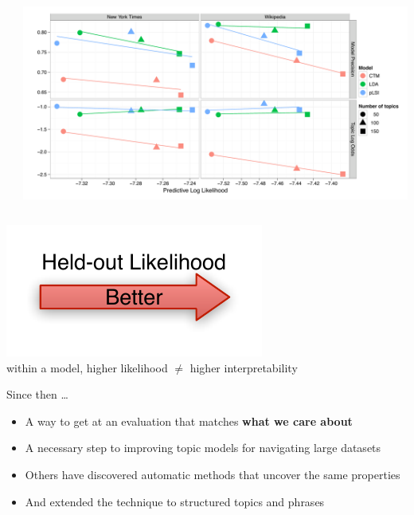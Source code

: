 {\begin{columns}
\begin{flushright}

\end{flushright}
  \includegraphics[scale=\graphscale]{reading_tea_leaves/tasks/legend}
\end{columns}
\vspace{-0.75cm}
\begin{center}
  \includegraphics[scale=\graphscale]{reading_tea_leaves/tasks/held-out} \\
 {within a model, higher likelihood $\not =$ higher interpretability}
\end{center}
}


\begin{frame}{Since then \dots}

  \begin{itemize}
    \item A way to get at an evaluation that matches {\bf what we care about}
    \item A necessary step to improving topic models for navigating large datasets~\cite{talley-11}
    \item Others have discovered automatic methods that uncover the same properties~\cite{newman-10,mimno-11}
    \item And extended the technique to structured topics and phrases~\cite{lindsey-12,weninger-12}
  \end{itemize}

\end{frame}
